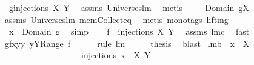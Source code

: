 \begin{isabellebody}
\ {}{\isacharcolon}\ {\isachardoublequoteopen}g{\isasymin}injections{\isacharprime}\ {\isacharquery}X\ Y{\isachardoublequoteclose}\ \isamarkupfalse%
\ assms\ Universes{\isachardot}lm{}{}\ \isamarkupfalse%
\ metis\ \isanewline
\ \ \isamarkupfalse%
\ {\isachardoublequoteopen}Domain\ g{\isacharequal}{\isacharquery}X{\isachardoublequoteclose}\ \isamarkupfalse%
\ assms{\isacharparenleft}{}{\isacharparenright}\ Universes{\isachardot}lm{}{}\ mem{\isacharunderscore}Collect{\isacharunderscore}eq\ \isamarkupfalse%
\ {\isacharparenleft}metis\ {\isacharparenleft}mono{\isacharunderscore}tags{\isacharcomma}\ lifting{\isacharparenright}{\isacharparenright}\isanewline
\ \ \isamarkupfalse%
\ \isamarkupfalse%
\ {}{\isacharcolon}\ {\isachardoublequoteopen}x\ {\isasymin}\ Domain\ g{\isachardoublequoteclose}\ \isamarkupfalse%
\ simp\ \isamarkupfalse%
\ \isamarkupfalse%
\ {\isachardoublequoteopen}{\isacharquery}f\ {\isasymin}\ injections\ X\ Y{\isachardoublequoteclose}\ \isamarkupfalse%
\ assms\ lm{}{}c\ \isamarkupfalse%
\ fast\isanewline
\ \ \isamarkupfalse%
\ \isamarkupfalse%
\ {\isachardoublequoteopen}g{\isasymin}{\isacharbraceleft}{\isacharquery}f{\isasymunion}{\isacharbraceleft}{\isacharparenleft}x{\isacharcomma}y{\isacharparenright}{\isacharbraceright}{\isacharbar}y{\isachardot}\ y{\isasymin}Y{\isacharminus}Range\ {\isacharquery}f{\isacharbraceright}{\isachardoublequoteclose}\ \isamarkupfalse%
\ {}\ {}\ \isamarkupfalse%
\ {\isacharparenleft}rule\ lm{}{}{\isacharparenright}\isanewline
\ \ \isamarkupfalse%
\ \isamarkupfalse%
\ {\isacharquery}thesis\ \isamarkupfalse%
\ blast\isanewline
{}\isamarkupfalse%
%
\endisatagproof
{\isafoldproof}%
%
\isadelimproof
\isanewline
%
\endisadelimproof
\isanewline
{}\isamarkupfalse%
\ lm{}{}b{\isacharcolon}\ \ {\isachardoublequoteopen}x\ {\isasymnotin}\ X{\isachardoublequoteclose}\ \isanewline
\ \ \ \ \ \ \ \ \ \ \ \ \ \ \ \ \ \ \ {\isachardoublequoteopen}injections\ {\isacharparenleft}{\isacharbraceleft}x{\isacharbraceright}\ {\isasymunion}\ X{\isacharparenright}\ Y\ {\isasymsubseteq}\ \isanewline

\end{isabellebody}
